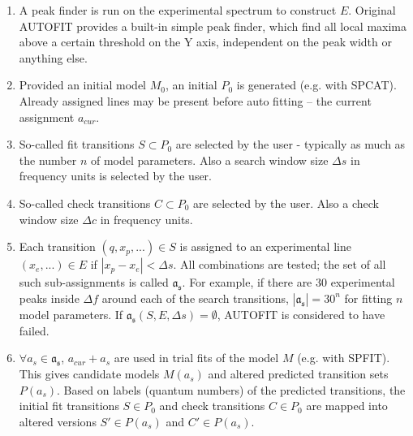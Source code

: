 \documentclass[11pt]{article}
\begin{document}
\begin{enumerate}
	\item A peak finder is run on the experimental spectrum to construct $E$. Original AUTOFIT provides a built-in simple peak finder, which find all local maxima above a certain threshold on the Y axis, independent on the peak width or anything else. 
	\item Provided an initial model $M_0$, an initial $P_0$ is generated (e.g. with SPCAT). Already assigned lines may be present before auto fitting -- the current assignment $a_{cur}$.
	\item So-called fit transitions $S \subset P_0$ are selected by the user - typically as much as the number $n$ of model parameters. Also a search window size $\Delta s$ in frequency units is selected by the user.
	\item So-called check transitions $C \subset P_0$ are selected by the user. Also a check window size $\Delta c$ in frequency units. 
		\item Each transition $(q, x_p, ...) \in S$ is assigned to an experimental line $(x_e, ...) \in E$ if $|x_p - x_e| < \Delta s$. All combinations are tested; the set of all such sub-assignments is called $\mathfrak{a_s}$. For example, if there are 30 experimental peaks inside $\Delta f$ around each of the search transitions, $|\mathfrak{a_s}| = 30^{n}$ for fitting $n$ model parameters. If $\mathfrak{a_s}(S, E, \Delta s) = \emptyset$, AUTOFIT is considered to have failed. 
		\item $\forall a_s \in \mathfrak{a_s}$, $a_{cur} + a_s$ are used in trial fits of the model $M$ (e.g. with SPFIT). This gives candidate models $M(a_s)$ and altered predicted transition sets $P(a_s)$. Based on labels (quantum numbers) of the predicted transitions, the initial fit transitions $S \in P_0$ and check transitions $C \in P_0$ are mapped into altered versions $S' \in P(a_s)$ and $C' \in P(a_s)$. 


\end{enumerate}
\end{document}
